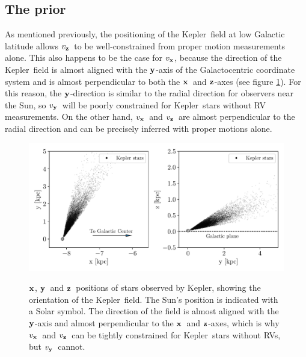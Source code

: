 \documentclass[]{aastex631}
\newcommand{\kepler}{{Kepler}}
\newcommand{\vx}{$v_{\bf x}$}
\newcommand{\vy}{$v_{\bf y}$}
\newcommand{\vz}{$v_{\bf z}$}
\newcommand{\x}{${\bf x}$}
\newcommand{\y}{${\bf y}$}
\newcommand{\z}{${\bf z}$}
\begin{document}
\subsection{The prior}
\label{sec:prior}

As mentioned previously, the positioning of the \kepler\ field at low Galactic
latitude allows \vz\ to be well-constrained from proper motion measurements
alone.
This also happens to be the case for \vx, because the direction of the
\kepler\ field is almost aligned with the \y-axis of the Galactocentric
coordinate system and is almost perpendicular to both the \x\ and \z-axes (see
figure \ref{fig:kepler_field}).
For this reason, the \y-direction is similar to the radial direction for
observers near the Sun, so \vy\ will be poorly constrained for \kepler\ stars
without RV measurements.
On the other hand, \vx\ and \vz\ are almost perpendicular to the radial
direction and can be precisely inferred with proper motions alone.
\begin{figure}[ht!]
\caption{
\x, \y\ and \z\ positions of stars observed by \kepler, showing the
    orientation of the \kepler\ field.
The Sun's position is indicated with a Solar symbol.
The direction of the field is almost aligned with the \y-axis and almost
    perpendicular to the \x\ and \z-axes, which is why \vx\ and \vz\ can be
    tightly constrained for \kepler\ stars without RVs, but \vy\ cannot.
}
  \centering
    \includegraphics[width=.7\textwidth]{kepler_field}
\label{fig:kepler_field}
\end{figure}
\end{document}

